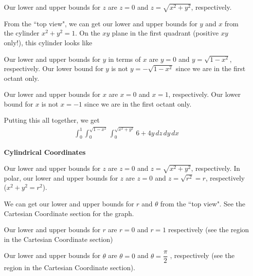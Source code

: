 \documentclass{article}
\begin{document}
Our lower and upper bounds for $z$ are $z=0$ and $z=\sqrt{x^2+y^2}$, respectively.

From the ``top view", we can get our lower and upper bounds for $y$ and $x$ from the cylinder $x^2+y^2=1$. On the $xy$ plane in the first quadrant (positive $xy$ only!), this cylinder looks like
\begin{center}
\end{center}
Our lower and upper bounds for $y$ in terms of $x$ are $y=0$ and $y=\sqrt{1-x^2}$, respectively. Our lower bound for $y$ is not $y=-\sqrt{1-x^2}$ since we are in the first octant only.

Our lower and upper bounds for $x$ are $x=0$ and $x=1$, respectively. Our lower bound for $x$ is not $x=-1$ since we are in the first octant only.

Putting this all together, we get
\begin{align*}
    \int_{0}^1\int_{0}^{\sqrt{1-x^2}}\int_0^{\sqrt{x^2+y^2}}6+4y\,dz\,dy\,dx
\end{align*}
\textbf{Cylindrical Coordinates}

Our lower and upper bounds for $z$ are $z=0$ and $z=\sqrt{x^2+y^2}$, respectively. In polar, our lower and upper bounds for $z$ are $z=0$ and $z=\sqrt{r^2}=r$, respectively ($x^2+y^2=r^2$).

We can get our lower and upper bounds for $r$ and $\theta$ from the ``top view". See the Cartesian Coordinate section for the graph.

Our lower and upper bounds for $r$ are $r=0$ and $r=1$ respectively (see the region in the Cartesian Coordinate section)

Our lower and upper bounds for $\theta$ are $\theta=0$ and $\theta =\dfrac{\pi}{2}$ , respectively (see the region in the Cartesian Coordinate section).
\end{document}
